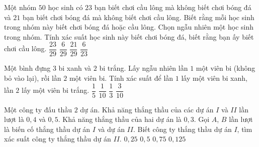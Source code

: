 \begin{ex}%
	Một nhóm $50$ học sinh có $23$ bạn biết chơi cầu lông mà không biết chơi bóng đá và $21$ bạn biết chơi bóng đá mà không biết chơi cầu lông. Biết rằng mỗi học sinh trong nhóm này biết chơi bóng đá hoặc cầu lông. Chọn ngẫu nhiên một học sinh trong nhóm. Tính xác suất học sinh này biết chơi bóng đá, biết rằng bạn ấy biết chơi cầu lông. 
	\choice
	{$\dfrac{23}{29}$}
	{\True$\dfrac{6}{29}$}
	{$\dfrac{21}{29}$}
	{$\dfrac{6}{23}$}
\end{ex}

\begin{ex}%
	Một bình đựng $3$ bi xanh và $2$ bi trắng. Lấy ngẫu nhiên lần $1$ một viên bi (không bỏ vào lại), rồi lần $2$ một viên bi. Tính xác suất để lần $1$ lấy một viên bi xanh, lần $2$ lấy một viên bi trắng.
	\choice
	{$\dfrac{1}{5}$}
	{$\dfrac{1}{10}$}
	{$\dfrac{1}{3}$}
	{\True $\dfrac{3}{10}$}
\end{ex}	

\begin{ex}%
	Một công ty đấu thầu $2$ dự án. Khả năng thắng thầu của các dự án $I$ và $II$ lần lượt là $0{,}4$ và $0{,}5$. Khả năng thắng thầu của hai dự án là $0{,}3$. Gọi $A$, $B$ lần lượt là biến cố thắng thầu dự án $I$ và dự án $II$. Biết công ty thắng thầu dự án $I$, tìm xác suất công ty thắng thầu dự án $II$.
	\choice
	{$0{,}25$}
	{$0{,}5$}
	{\True$0{,}75$}
	{$0{,}125$}
\end{ex}

